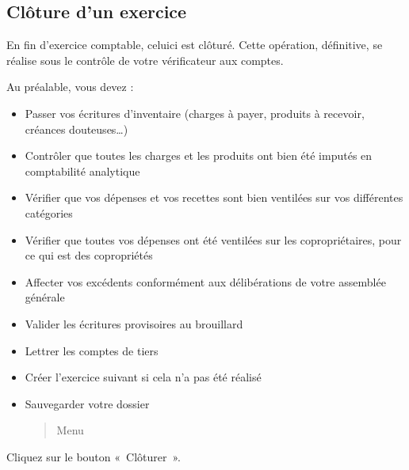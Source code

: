 \documentclass[a4paper,10pt,oneside,french]{sphinxmanual}
\begin{document}
\subsection{Clôture d’un exercice}
\label{\detokenize{accounting/fiscalyear:cloture-d-un-exercice}}
\sphinxAtStartPar
En fin d’exercice comptable, celui\sphinxhyphen{}ci est clôturé. Cette opération, définitive, se réalise sous le contrôle de votre
vérificateur aux comptes.

\sphinxAtStartPar
Au préalable, vous devez :
\begin{itemize}
\item {} 
\sphinxAtStartPar
Passer vos écritures d’inventaire (charges à payer, produits à recevoir, créances douteuses…)

\item {} 
\sphinxAtStartPar
Contrôler que toutes les charges et les produits ont bien été imputés en comptabilité analytique

\item {} 
\sphinxAtStartPar
Vérifier que vos dépenses et vos recettes sont bien ventilées sur vos différentes catégories

\item {} 
\sphinxAtStartPar
Vérifier que toutes vos dépenses ont été ventilées sur les copropriétaires, pour ce qui est des copropriétés

\item {} 
\sphinxAtStartPar
Affecter vos excédents conformément aux délibérations de votre assemblée générale

\item {} 
\sphinxAtStartPar
Valider les écritures provisoires au brouillard

\item {} 
\sphinxAtStartPar
Lettrer les comptes de tiers

\item {} 
\sphinxAtStartPar
Créer l’exercice suivant si cela n’a pas été réalisé

\item {} 
\sphinxAtStartPar
Sauvegarder votre dossier
\begin{quote}

\sphinxAtStartPar
Menu 
\end{quote}

\end{itemize}

\sphinxAtStartPar
Cliquez sur le bouton « Clôturer ».
\end{document}
